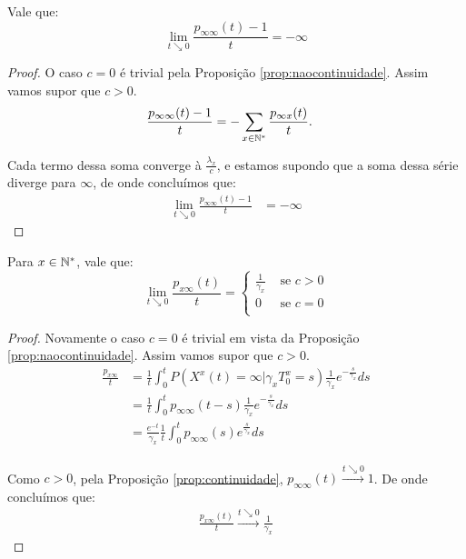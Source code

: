 \begin{proposicao}
  \label{prop:taxa-inf-inf}
  Vale que:
  \begin{displaymath}
    \lim_{t \searrow 0} \frac{p_{\infty \infty}(t) - 1}{t} = -\infty
  \end{displaymath}
\end{proposicao}
\begin{proof}
  O caso $c = 0$ é trivial pela Proposição
  \ref{prop:naocontinuidade}. Assim vamos supor que $c > 0$.
  \begin{align*}
    \frac{p_{\infty \infty} (t) - 1}{t} &= - \sum_{x \in {\mathbb{N^*}}}
      \frac{p_{\infty x} (t)}{t}.
  \end{align*}

  Cada termo dessa soma converge à $\frac{\lambda_x}{c}$, e estamos
  supondo que a soma dessa série diverge para $\infty$, de onde
  concluímos que:
  \begin{align*}
    \lim_{t \searrow 0}\frac{p_{\infty \infty} (t) - 1}{t} &= - \infty
  \end{align*}
\end{proof}

\begin{proposicao}
  \label{prop:taxa-x-inf}
  Para $x \in {\mathbb{N^*}}$, vale que:
  \begin{displaymath}
    \lim_{t \searrow 0} \frac{p_{x \infty}(t)}{t} = \begin{cases}
      \frac{1}{\gamma_x} & \textrm{ se } c > 0 \\
      0 & \textrm{ se } c = 0 \\
    \end{cases}
  \end{displaymath}
\end{proposicao}
\begin{proof}
  Novamente o caso $c = 0$ é trivial em vista da Proposição
  \ref{prop:naocontinuidade}. Assim vamos supor que $c > 0$.
  \begin{align*}
    \frac{p_{x \infty}}{t} &= \frac{1}{t} \int_0^t P(X^x (t) = \infty | \gamma_x
    T^x_0 = s) \frac{1}{\gamma_x}e^{-\frac{s}{\gamma_x}} ds\\
    &= \frac{1}{t} \int_0^t p_{\infty \infty} (t-s)
    \frac{1}{\gamma_x}e^{-\frac{s}{\gamma_x}} ds\\
    &= \frac{e^{-t}}{\gamma_x} \frac{1}{t} \int_0^t p_{\infty \infty} (s)
    e^{\frac{s}{\gamma_x}} ds\\
  \end{align*}

  Como $c>0$, pela Proposição \ref{prop:continuidade}, $p_{\infty
    \infty} (t) \xrightarrow{t \searrow 0} 1$. De onde concluímos que:
   \begin{align*}
    \frac{p_{x \infty}(t)}{t} \xrightarrow{t \searrow 0} 
    \frac{1}{\gamma_x}
  \end{align*}
\end{proof}


